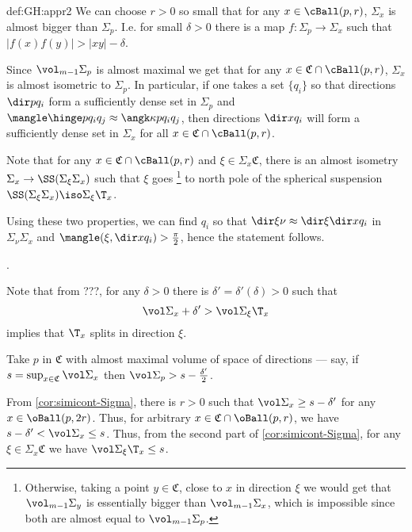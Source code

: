 {\begin{subthm}{def:GH:appr2}
 We can choose $ r>0$ so small that for any $x\in \cBall(p, r)$, 
$\Sigma_x$ is almost bigger than $\Sigma_p$.
I.e. for small $\delta>0$ there is a map $f:\Sigma_p\to \Sigma_x$ such that $|f(x)f(y)|>|x y|-\delta$. 

Since $\vol_{m-1} \Sigma_p$ is almost maximal we get that for any 
$x\in  \mathfrak C\cap \cBall(p, r)$, $\Sigma_x$ is almost isometric to $\Sigma_p$.
In particular, if one takes a set $\{q_i\}$ so that directions $\dir p {q_i}$
form a sufficiently dense set in $\Sigma_p$ and 
$\mangle\hinge p{q_i}{q_j}\approx\angk\kappa p{q_i}{q_j}$, 
then directions $\dir x{q_i}$ will form a sufficiently dense set in
$\Sigma_x$ for all $x\in\mathfrak C\cap \cBall(p, r)$.

Note that for any $x\in  \mathfrak C\cap \cBall(p, r)$ and $\xi\in
\Sigma_x\mathfrak C$,  there is an almost isometry $\Sigma_x\to \SS(\Sigma_\xi \Sigma_x)$ such
that $\xi$ goes%
\footnote{Otherwise, taking a point $y\in \mathfrak C$, close to $x$ in direction
$\xi$ we would get that $\vol_{m-1}\Sigma_y$ is essentially bigger than
$\vol_{m-1}\Sigma_x$, which is impossible since both are almost equal to
$\vol_{m-1}\Sigma_p$.} 
to north pole of the spherical suspension 
$\SS(\Sigma_\xi \Sigma_x)\iso\Sigma_\xi\T_x$.

Using these two properties, we can find $q_i$ so that 
$\dir\xi\nu\approx\dir \xi{\dir x{q_i}}$ in $\Sigma_\nu \Sigma_x$ and
$\mangle(\xi,\dir x{q_i})>\tfrac\pi2$, hence the statement follows.






















.

Note that from ???,
for any $\delta>0$ there is $\delta'=\delta'(\delta)>0$ such that
$$\vol\Sigma_x+\delta'>\vol\Sigma_\xi\T_x$$
implies that $\T_x$ splits in direction $\xi$.

Take $p$ in $\mathfrak C$ with almost maximal volume of space of directions ---
say, if $s=\sup_{x\in \mathfrak C}\vol\Sigma_x$ then
$\vol\Sigma_p>s-\tfrac{\delta'}2$.

From \ref{cor:simicont-Sigma},
there is $r>0$ such that 
$\vol\Sigma_x\ge s-\delta'$ for any $x\in\oBall(p,2r)$.
Thus, for arbitrary $x\in\mathfrak C\cap \oBall(p,r)$, we have $s-\delta'<\vol\Sigma_x\le s$.
Thus, from the second part of \ref{cor:simicont-Sigma}, 
for any $\xi\in\Sigma_x\mathfrak C$ we have
$\vol \Sigma_\xi\T_x\le s$.


\end{subthm}}
